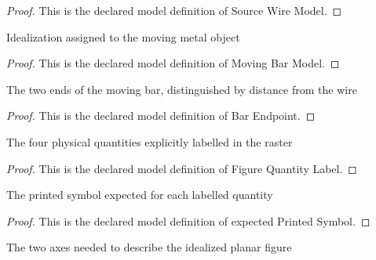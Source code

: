 \begin{proof}
  This is the declared model definition of Source Wire Model.
\end{proof}
\begin{definition}
  \label{def:physics:phyx-mini-0883:phyxminiproblems-problemphyxmini0883-movingbarmodel}
  Idealization assigned to the moving metal object
\end{definition}
\begin{proof}
  This is the declared model definition of Moving Bar Model.
\end{proof}
\begin{definition}
  \label{def:physics:phyx-mini-0883:phyxminiproblems-problemphyxmini0883-barendpoint}
  The two ends of the moving bar, distinguished by distance from the wire
\end{definition}
\begin{proof}
  This is the declared model definition of Bar Endpoint.
\end{proof}
\begin{definition}
  \label{def:physics:phyx-mini-0883:phyxminiproblems-problemphyxmini0883-figurequantitylabel}
  The four physical quantities explicitly labelled in the raster
\end{definition}
\begin{proof}
  This is the declared model definition of Figure Quantity Label.
\end{proof}
\begin{definition}
  \label{def:physics:phyx-mini-0883:phyxminiproblems-problemphyxmini0883-expectedprintedsymbol}
  The printed symbol expected for each labelled quantity
\end{definition}
\begin{proof}
  This is the declared model definition of expected Printed Symbol.
\end{proof}
\begin{definition}
  \label{def:physics:phyx-mini-0883:phyxminiproblems-problemphyxmini0883-figureaxis}
  The two axes needed to describe the idealized planar figure
\end{definition}
